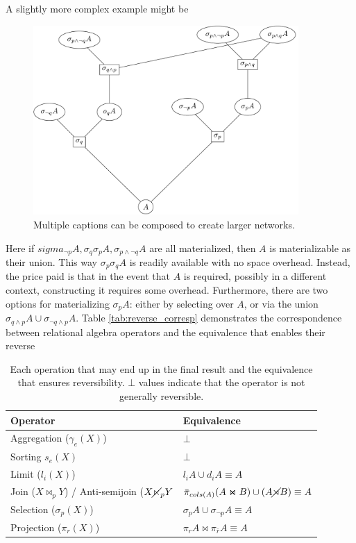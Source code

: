 A slightly more complex example might be

\begin{figure}[H]
  \centering
  \includegraphics[width=0.9\textwidth]{./imgs/selsub.pdf}
  \caption{Multiple captions can be composed to create larger
    networks.}
\end{figure}

Here if
\(sigma_{\neg p}A,\sigma_q \sigma_{p} A,\sigma_{p \land \neg q}A\) are
all materialized, then \(A\) is materializable as their union. This
way \(\sigma_p \sigma_q A\) is readily available with no space
overhead. Instead, the price paid is that in the event that \(A\) is
required, possibly in a different context, constructing it requires some
overhead. Furthermore, there are two options for materializing
\(\sigma_p A\): either by selecting over \(A\), or via the union
\(\sigma_{q \land p}A \cup \sigma_{\neg q \land p}A\). Table \ref{tab:reverse_corresp}
demonstrates the correspondence between relational algebra operators
and the equivalence that enables their reverse 
\begin{table}[H]
  \centering
  \caption{\label{tab:reverse_cprresp}Each operation that may end up in the final result and the equivalence that ensures reversibility. \(\bot\) values indicate that the operator is not generally reversible.}
  \begin{tabular}{ll}
    Operator & Equivalence\\
    \hline
    Aggregation (\(\gamma_e(X)\)) & \(\bot\) \\
    Sorting \(s_e(X)\) & \(\bot\) \\
    Limit (\(l_i(X)\)) & \(l_i A \cup d_i A \equiv A\) \\
    Join (\(X \Join_p Y\)) / Anti-semijoin (\(X \cancel\ltimes_p Y\) & \( \bar{\pi}_{cols(A)}(A \Join B) \cup (A \cancel\rtimes B) \equiv A\)  \\
    Selection (\(\sigma_p(X)\)) & \(\sigma_p A \cup \sigma_{\neg p} A \equiv A\) \\
    Projection (\(\pi_r(X)\)) & \(\pi_r A \Join \pi_{\bar{r}} A \equiv A\) \\
  \end{tabular}
\end{table}

